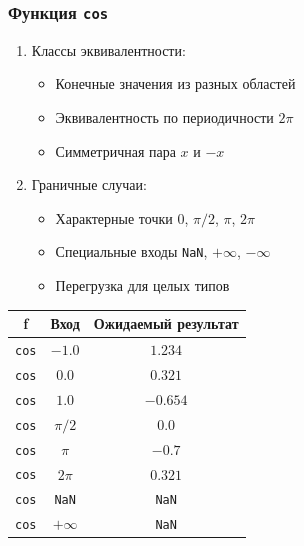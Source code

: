 \documentclass[12pt,a4paper]{report}
\begin{document}
\subsubsection*{Функция \texttt{cos}}
\begin{enumerate}
    \item Классы эквивалентности:
          \begin{itemize}
              \item Конечные значения из разных областей
              \item Эквивалентность по периодичности $2\pi$
              \item Симметричная пара $x$ и $-x$
          \end{itemize}
    \item Граничные случаи:
          \begin{itemize}
              \item Характерные точки $0$, $\pi/2$, $\pi$, $2\pi$
              \item Специальные входы \texttt{NaN}, $+\infty$, $-\infty$
              \item Перегрузка для целых типов
          \end{itemize}
\end{enumerate}
\begin{center}
    \begin{tabular}{|c|c|c|}
        \hline
        \textbf{f} & \textbf{Вход} & \textbf{Ожидаемый результат} \\
        \hline
        \texttt{cos} & $-1.0$ & $1.234$ \\
        \hline
        \texttt{cos} & $0.0$ & $0.321$ \\
        \hline
        \texttt{cos} & $1.0$ & $-0.654$ \\
        \hline
        \texttt{cos} & $\pi/2$ & $0.0$ \\
        \hline
        \texttt{cos} & $\pi$ & $-0.7$ \\
        \hline
        \texttt{cos} & $2\pi$ & $0.321$ \\
        \hline
        \texttt{cos} & \texttt{NaN} & \texttt{NaN} \\
        \hline
        \texttt{cos} & $+\infty$ & \texttt{NaN} \\
        \hline
    \end{tabular}
\end{center}
\end{document}
